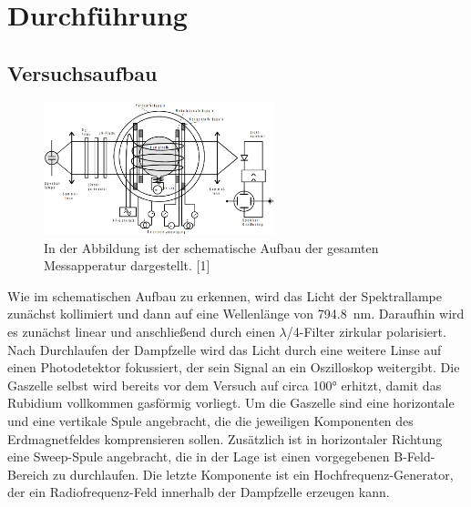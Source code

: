 \newpage
\section{Durchführung}
    \subsection{Versuchsaufbau}

        \FloatBarrier

        \begin{figure}[h]
          \centering
          \includegraphics[width = 0.6\textwidth]{pictures/Aufbau.png}
          \caption{In der Abbildung ist der schematische Aufbau der gesamten Messapperatur dargestellt. [1]}
          \label{fig:Aufbau}
        \end{figure}

        \FloatBarrier

        \noindent
        Wie im schematischen Aufbau zu erkennen, wird das Licht der Spektrallampe zunächst kollimiert und dann auf eine Wellenlänge von \SI{794.8}{\nano\metre}. Daraufhin wird es zunächst linear und anschließend 
        durch einen $\lambda$/4-Filter zirkular polarisiert. Nach Durchlaufen der Dampfzelle wird das Licht durch eine weitere Linse auf einen Photodetektor fokussiert, der sein Signal an ein Oszilloskop 
        weitergibt. Die Gaszelle selbst wird bereits vor dem Versuch auf circa 100° erhitzt, damit das Rubidium vollkommen gasförmig vorliegt. Um die Gaszelle sind eine horizontale und eine vertikale Spule 
        angebracht, die die jeweiligen Komponenten des Erdmagnetfeldes komprensieren sollen. Zusätzlich ist in horizontaler Richtung eine Sweep-Spule angebracht, die in der Lage ist einen vorgegebenen 
        B-Feld-Bereich zu durchlaufen. Die letzte Komponente ist ein Hochfrequenz-Generator, der ein Radiofrequenz-Feld innerhalb der Dampfzelle erzeugen kann.

